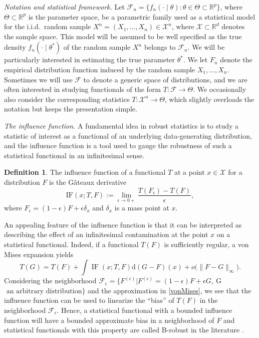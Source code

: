 \documentclass[11pt, oneside]{amsart}
\theoremstyle{definition}   %
\newtheorem{definition}{Definition}
\newcommand{\IF}{\operatorname{IF}}
\begin{document}
\emph{Notation and statistical framework.} 
Let  $\mathcal{F}_n = \{f_n(\cdot \mid \theta): \theta \in\Theta\subset \mathbb{R}^p \}$, where $\Theta\subset\mathbb R^p$ is the parameter space, be a parametric family used as a statistical model for the i.i.d.\ random sample $X^n = (X_1,\dots,X_n) \in \mathcal{X}^n$, where $\mathcal{X}\subset\mathbb{R}^d$ denotes the sample space. This model will be assumed to be well specified as the true density $f_n(\cdot \mid \theta^*)$ of the random sample $X^n$ belongs to $\mathcal{F}_n$. We will be particularly interested in estimating the true parameter $\theta^*$. We let $F_n$ denote the empirical distribution function induced by the random sample $X_1,\dots,X_n$. Sometimes we will use $\mathcal{F}$ to denote a generic space of distributions, and we are often interested in studying functionals of the form $T:\mathcal{F}\to\Theta$. We occasionally also consider the corresponding statistics $T:\mathcal{X}^n\to\Theta$, which slightly overloads the notation but keeps the presentation simple.

\emph{The influence function.} A fundamental idea  in robust statistics is to study a statistic of interest as a functional of an underlying data-generating distribution, and the influence function is a tool used to gauge the robustness of such a statistical functional in an infinitesimal sense. 
 

\begin{definition}
 The influence function of a functional $T$ at a point $x\in\mathcal{X}$ for a distribution $F$ is the G{\^a}teaux derivative  
%
\begin{equation*}
    \mathrm{IF}(x;T,F):=\lim_{\epsilon\to 0+}\frac{T(F_\epsilon)-T(F)}{\epsilon},
\end{equation*} 
%
where $F_\epsilon=(1-\epsilon)F+\epsilon\delta_x$ and $\delta_x$ is a mass point at $x$. 
\end{definition}
%
An appealing feature of the  influence function is that it can be interpreted as describing the effect of an infinitesimal contamination at the point $x$ on a statistical functional. Indeed, if a functional $T(F)$ is sufficiently regular, a von Mises expansion \citep{vonmises1947,hampel1974, hampeletal1986} yields
\begin{equation}
\label{vonMises}
T(G) = T(F)+\int \IF(x; T,F)\mathrm{d}(G-F)(x) +o\big(\|F-G\|_\infty\big).
\end{equation}
%
Considering the neighborhood $\mathcal{F}_\epsilon=\{F^{(\epsilon)}| F^{(\epsilon)}=(1-\epsilon)F+ \epsilon G, ~$G$ \mbox{ an arbitrary distribution}\}$ and the  approximation in \eqref{vonMises},   we see that the influence function can be used to linearize the ``bias'' of $T(F)$ in the neighborhood $\mathcal{F}_\epsilon$. Hence, a statistical functional with a bounded influence function will have a bounded approximate bias in a neighborhood of $F$ and statistical functionals with this property are called B-robust in the literature \citep{hampeletal1986}. 
\end{document}
